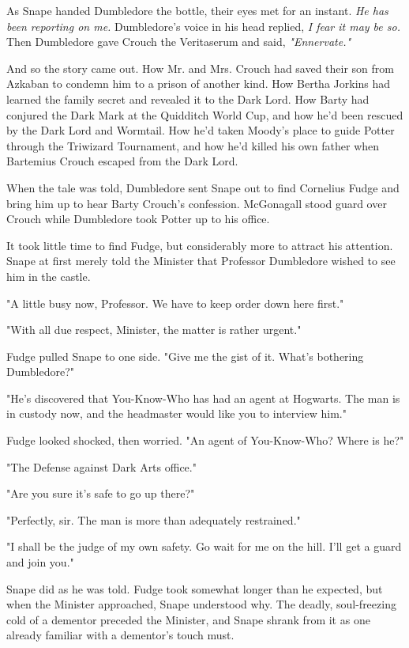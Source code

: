 \documentclass[a4paper,11pt]{article}
\begin{document}
As Snape handed Dumbledore the bottle, their eyes met for an instant. \emph{He has been reporting on me.} Dumbledore's voice in his head replied, \emph{I fear it may be so.} Then Dumbledore gave Crouch the Veritaserum and said, \emph{"Ennervate."}

And so the story came out. How Mr. and Mrs. Crouch had saved their son from Azkaban to condemn him to a prison of another kind. How Bertha Jorkins had learned the family secret and revealed it to the Dark Lord. How Barty had conjured the Dark Mark at the Quidditch World Cup, and how he'd been rescued by the Dark Lord and Wormtail. How he'd taken Moody's place to guide Potter through the Triwizard Tournament, and how he'd killed his own father when Bartemius Crouch escaped from the Dark Lord.

When the tale was told, Dumbledore sent Snape out to find Cornelius Fudge and bring him up to hear Barty Crouch's confession. McGonagall stood guard over Crouch while Dumbledore took Potter up to his office.

It took little time to find Fudge, but considerably more to attract his attention. Snape at first merely told the Minister that Professor Dumbledore wished to see him in the castle.

"A little busy now, Professor. We have to keep order down here first."

"With all due respect, Minister, the matter is rather urgent."

Fudge pulled Snape to one side. "Give me the gist of it. What's bothering Dumbledore?"

"He's discovered that You-Know-Who has had an agent at Hogwarts. The man is in custody now, and the headmaster would like you to interview him."

Fudge looked shocked, then worried. "An agent of You-Know-Who? Where is he?"

"The Defense against Dark Arts office."

"Are you sure it's safe to go up there?"

"Perfectly, sir. The man is more than adequately restrained."

"I shall be the judge of my own safety. Go wait for me on the hill. I'll get a guard and join you."

Snape did as he was told. Fudge took somewhat longer than he expected, but when the Minister approached, Snape understood why. The deadly, soul-freezing cold of a dementor preceded the Minister, and Snape shrank from it as one already familiar with a dementor's touch must.
\end{document}
